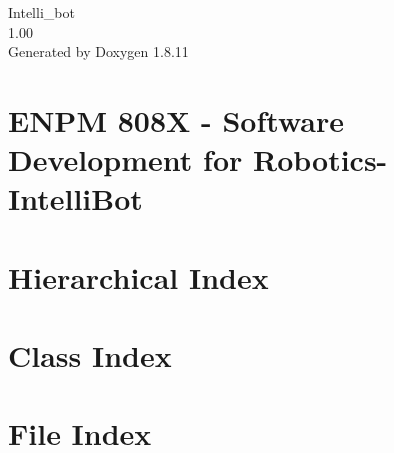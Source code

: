 \documentclass[twoside]{book}
\newcommand{\+}{\discretionary{\mbox{\scriptsize$\hookleftarrow$}}{}{}}
\newcommand{\clearemptydoublepage}{%
  \newpage{\pagestyle{empty}\cleardoublepage}%
}
\begin{document}
\hypersetup{pageanchor=false,
             bookmarksnumbered=true,
             pdfencoding=unicode
            }
\begin{titlepage}
\vspace*{7cm}
\begin{center}%
{\Large Intelli\+\_\+bot \\[1ex]\large 1.\+00 }\\
\vspace*{1cm}
{\large Generated by Doxygen 1.8.11}\\
\end{center}
\end{titlepage}
\clearemptydoublepage
\tableofcontents
\clearemptydoublepage
{}
\hypersetup{pageanchor=true}

\chapter{E\+N\+PM 808X -\/ Software Development for Robotics-\/ Intelli\+Bot}
\label{md_README}
\hypertarget{md_README}{}

\chapter{Hierarchical Index}

\chapter{Class Index}

\chapter{File Index}

\end{document}
